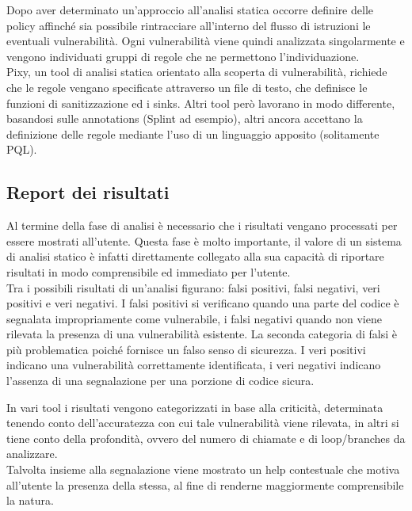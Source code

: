 Dopo aver determinato un'approccio all'analisi statica occorre definire delle policy affinché sia possibile rintracciare all'interno del flusso di istruzioni le eventuali vulnerabilità. Ogni vulnerabilità viene quindi analizzata singolarmente e vengono individuati gruppi di regole che ne permettono l'individuazione.\\
Pixy, un tool di analisi statica orientato alla scoperta di vulnerabilità, richiede che le regole vengano specificate attraverso un file di testo, che definisce le funzioni di sanitizzazione ed i sinks. Altri tool però lavorano in modo differente, basandosi sulle annotations (Splint ad esempio), altri ancora accettano la definizione delle regole mediante l'uso di un linguaggio apposito (solitamente PQL).

\subsection{Report dei risultati}
Al termine della fase di analisi è necessario che i risultati vengano processati per essere mostrati all'utente. Questa fase è molto importante, il valore di un sistema di analisi statico è infatti direttamente collegato alla sua capacità di riportare risultati in modo comprensibile ed immediato per l'utente.\\
Tra i possibili risultati di un'analisi figurano: falsi positivi, falsi negativi, veri positivi e veri negativi. I falsi positivi si verificano quando una parte del codice è segnalata impropriamente come vulnerabile, i falsi negativi quando non viene rilevata la presenza di una vulnerabilità esistente. La seconda categoria di falsi è più problematica poiché fornisce un falso senso di sicurezza. I veri positivi indicano una vulnerabilità correttamente identificata, i veri negativi indicano l'assenza di una segnalazione per una porzione di codice sicura.

In vari tool i risultati vengono categorizzati in base alla criticità, determinata tenendo conto dell'accuratezza con cui tale vulnerabilità viene rilevata, in altri si tiene conto della profondità, ovvero del numero di chiamate e di loop/branches da analizzare.\\
Talvolta insieme alla segnalazione viene mostrato un help contestuale che motiva all'utente la presenza della stessa, al fine di renderne maggiormente comprensibile la natura.